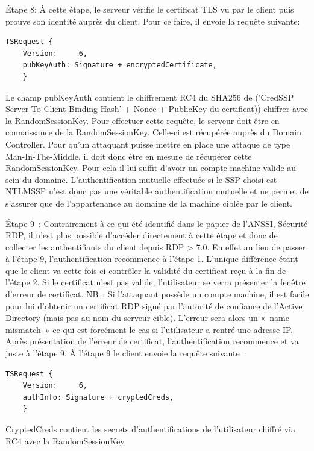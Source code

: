 Étape 8: À cette \'etape, le serveur vérifie le certificat TLS vu par le client puis prouve son identité auprès du client. Pour ce faire, il envoie la requête suivante:

\begin{lstlisting}[frame=single,basicstyle=\tiny]
TSRequest {
	Version:     6,
	pubKeyAuth: Signature + encryptedCertificate,
	}
\end{lstlisting}

Le champ pubKeyAuth contient le chiffrement RC4 du SHA256 de (’CredSSP Server-To-Client Binding Hash’ + Nonce + PublicKey du certificat)) chiffrer avec la RandomSessionKey.
Pour effectuer cette requête, le serveur doit être en connaissance de la RandomSessionKey. Celle-ci est r\'ecupérée auprès du Domain Controller. Pour qu’un attaquant puisse mettre en place une attaque de type Man-In-The-Middle, il doit donc être en mesure de récupérer cette RandomSessionKey. Pour cela il lui suffit d’avoir un compte machine valide au sein du domaine.
L’authentification mutuelle effectu\'ee si le SSP choisi est NTLMSSP n’est donc pas une véritable authentification mutuelle et ne permet de s'assurer que de l'appartenance au domaine de la machine ciblée par le client.

Étape 9 :
Contrairement à ce qui \'eté identifié dans le papier de l’ANSSI, Sécurité RDP, il n’est plus possible d’accéder directement à cette étape et donc de collecter les authentifiants du client depuis RDP > 7.0.
En effet au lieu de passer à l’\'etape 9, l’authentification recommence à l’étape 1. L'unique différence étant que le client va cette fois-ci contrôler la validité du certificat reçu à la fin de l’étape 2. Si le certificat n'est pas valide, l'utilisateur se verra présenter la fenêtre d'erreur de certificat.
NB : Si l’attaquant possède un compte machine, il est facile pour lui d’obtenir un certificat RDP sign\'e par l’autorité de confiance de l’Active Directory (mais pas au nom du serveur cible). L’erreur sera alors un « name mismatch » ce qui est forcément le cas si l’utilisateur a rentré une adresse IP.
Après pr\'esentation de l’erreur de certificat, l’authentification recommence et va juste à l’étape 9.
À l’\'etape 9 le client envoie la requête suivante :

\begin{lstlisting}[frame=single,basicstyle=\tiny]
TSRequest {
	Version:     6,
	authInfo: Signature + cryptedCreds,
	}
\end{lstlisting}


CryptedCreds contient les secrets d’authentifications de l’utilisateur chiffr\'e via RC4 avec la RandomSessionKey.

